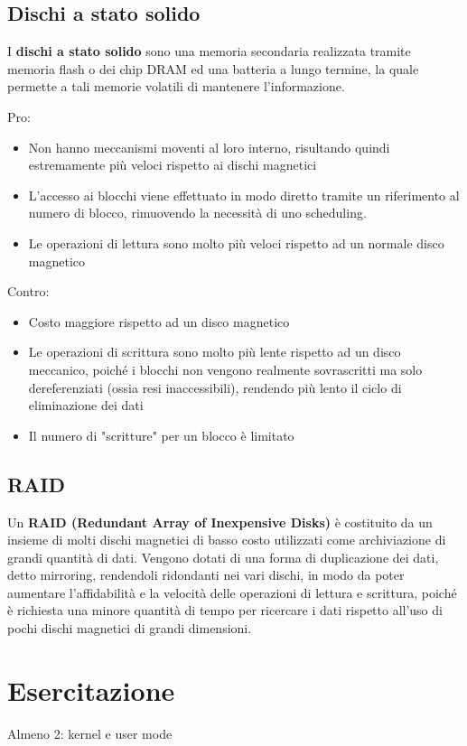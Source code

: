 \documentclass{article}
\begin{document}
\subsection{Dischi a stato solido}
I \textbf{dischi a stato solido} sono una memoria secondaria realizzata tramite memoria flash o dei chip DRAM ed una batteria a lungo termine, la quale permette a tali memorie volatili di mantenere l'informazione.\par
Pro:
\begin{itemize}
    \item Non hanno meccanismi moventi al loro interno, risultando quindi estremamente più veloci rispetto ai dischi magnetici
    \item L'accesso ai blocchi viene effettuato in modo diretto tramite un riferimento al numero di blocco, rimuovendo la necessità di uno scheduling.
    \item Le operazioni di lettura sono molto più veloci rispetto ad un normale disco magnetico
\end{itemize}
Contro:
\begin{itemize}
    \item Costo maggiore rispetto ad un disco magnetico
    \item Le operazioni di scrittura sono molto più lente rispetto ad un disco meccanico, poiché i blocchi non vengono realmente sovrascritti ma solo dereferenziati (ossia resi inaccessibili), rendendo più lento il ciclo di eliminazione dei dati
    \item Il numero di "scritture" per un blocco è limitato
\end{itemize}
\subsection{RAID}
Un \textbf{RAID (Redundant Array of Inexpensive Disks)} è costituito da un insieme di molti dischi magnetici di basso costo utilizzati come archiviazione di grandi quantità di dati.
Vengono dotati di una forma di duplicazione dei dati, detto mirroring, rendendoli ridondanti nei vari dischi, in modo da poter aumentare l'affidabilità e la velocità delle operazioni di lettura e scrittura, poiché è richiesta una minore quantità di tempo per ricercare i dati rispetto all'uso di pochi dischi magnetici di grandi dimensioni.
\pagebreak
\section{Esercitazione}
\begin{tcolorbox}[colback=green!5!white,colframe=green!75!black,title=Quante e quali modalità di esecuzione deve 
garantire la CPU (al minimo)?]

Almeno 2: kernel e user mode
\end{tcolorbox}
\end{document}
